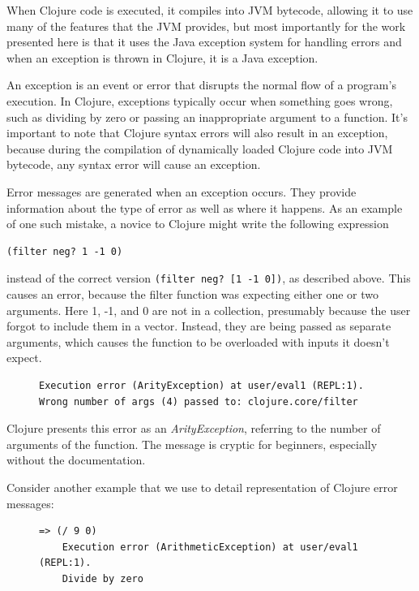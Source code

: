 \documentclass[12pt]{article}
\newcommand{\comment}[1]{}
\newcommand{\emcomment}[1]{\textcolor{ForestGreen}{\comment{Elena: {#1}}}}
\newcommand{\tkcomment}[1]{\textcolor{Teal}{\comment{Tristan: {#1}}}}
\begin{document}
When Clojure code is executed, it compiles into JVM bytecode, allowing it to use many of the features that the JVM provides, 
	but most importantly for the work presented here is that it uses the Java exception system for handling errors and when an exception is thrown in Clojure, it is a Java exception.

    
   An exception is an event or error that disrupts the normal flow of a program's execution. In Clojure, exceptions typically occur when something goes wrong, such as dividing by 
   zero or passing an inappropriate argument to a function. It's important to note that Clojure syntax errors will also result in an exception, because during the compilation of dynamically loaded Clojure code into JVM bytecode, 
   any syntax error will 
cause an exception.

   Error messages are generated when an exception occurs. They provide information about
   the type of error as well as where it happens. 
As an example of one such mistake, a novice to Clojure might write the following expression
\begin{verbatim}
(filter neg? 1 -1 0)
\end{verbatim}
instead of the correct version \texttt{(filter neg? [1 -1 0])}, as described above.
This causes an error, because the filter function was expecting either one or two arguments. 
Here 1, -1, and 0 are not in a collection, presumably because the user forgot to include them in a vector. 
 Instead, they are being passed as separate arguments, which causes the function to be overloaded with inputs it doesn't expect.

 \begin{figure}[h]
	\centering
	\begin{lstlisting}[breaklines=true, basicstyle=\ttfamily]
Execution error (ArityException) at user/eval1 (REPL:1).
Wrong number of args (4) passed to: clojure.core/filter
	\end{lstlisting}
\end{figure}
 Clojure presents this error as an {\it ArityException}, referring to the number of arguments of the function. 
 The message is cryptic for beginners, especially without the documentation.

Consider another example that we use to detail representation of Clojure error messages: 
	\begin{figure}[h]
		\centering
		\begin{lstlisting}[breaklines=true, basicstyle=\ttfamily]
	=> (/ 9 0)
	Execution error (ArithmeticException) at user/eval1 (REPL:1).
	Divide by zero
		\end{lstlisting}
	\end{figure}
\end{document}
